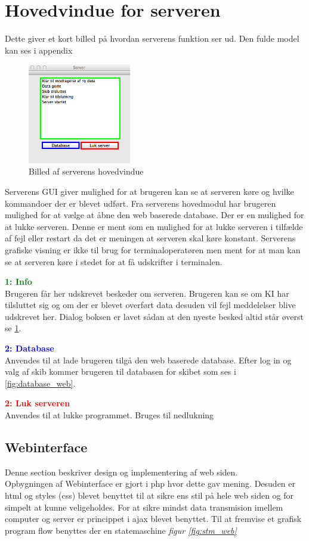 \section*{Hovedvindue for serveren}
Dette giver et kort billed på hvordan serverens funktion ser ud. Den fulde model kan ses i appendix
\begin{figure}[htbp]
	\centering
	\includegraphics[width=0.4\textwidth]{billeder/server}
	\caption{Billed af serverens hovedvindue}
	\label{fig:server}
\end{figure}
Serverens GUI giver mulighed for at brugeren kan se at serveren køre og hvilke kommandoer der er blevet udført. Fra serverens hovedmodul har brugeren mulighed for at vælge at åbne den web baserede database. Der er en mulighed for at lukke serveren. Denne er ment som en mulighed for at lukke serveren i tilfælde af fejl eller restart da det er meningen at serveren skal køre konstant. Serverens grafiske visning er ikke til brug for terminaloperatøren men ment for at man kan se at serveren køre i stedet for at få udskrifter i terminalen.

\textcolor{green}{\textbf{1: Info}}\\
Brugeren får her udskrevet beskeder om serveren. Brugeren kan se om KI har tilsluttet sig og om der er blevet overført data desuden vil fejl meddelelser blive udskrevet her. Dialog boksen er lavet sådan at den nyeste besked altid står øverst se \ref{fig:server}.

\textcolor{blue}{\textbf{2: Database}}\\
Anvendes til at lade brugeren tilgå den web baserede database. Efter log in og valg af skib kommer brugeren til databasen for skibet som ses i \ref{fig:database_web}.

\textcolor{red}{\textbf{2: Luk serveren}}\\
Anvendes til at lukke programmet. Bruges til nedlukning\\


\subsection{Webinterface}
Denne section beskriver design og implementering af web siden.\\
Opbygningen af Webinterface er gjort i php hvor dette gav mening. Desuden er html og styles (css) blevet benyttet til at sikre ens stil på hele web siden og for simpelt at kunne veligeholdes. For at sikre mindst data transmision imellem computer og server er princippet i ajax blevet benyttet.
Til at fremvise et grafisk program flow benyttes der en statemaschine \textit{figur \ref{fig:stm_web}}
 
